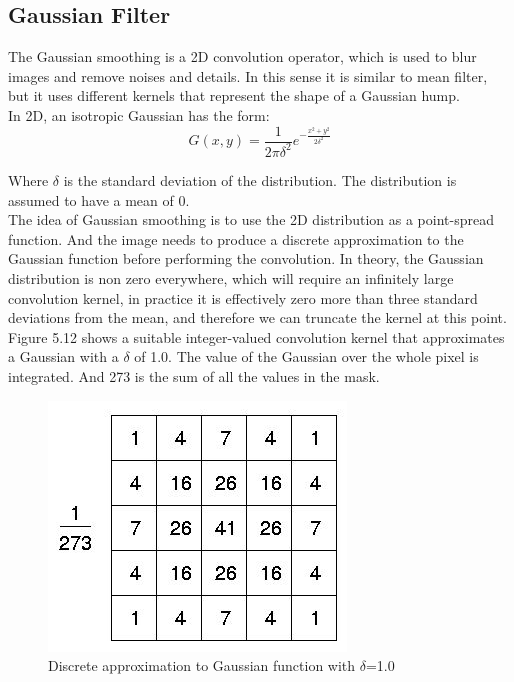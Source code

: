 \subsection{Gaussian Filter}
The Gaussian smoothing is a 2D convolution operator, which is used to blur images and remove noises and details. In this sense it is similar to mean filter, but it uses different kernels that represent the shape of a Gaussian hump. \\

In 2D, an isotropic Gaussian has the form:
\begin{displaymath}
G\left ( x,y \right ) = \frac{1}{2\pi \delta ^{2}}e^{-\frac{x^{2}+y^{2}}{2\delta ^{2}}}
\end{displaymath}

Where $\delta$ is the standard deviation of the distribution. The distribution is assumed to have a mean of 0.\\

The idea of Gaussian smoothing is to use the 2D distribution as a point-spread function. And the image needs to produce a discrete approximation to the Gaussian function before performing the convolution. In theory, the Gaussian distribution is non zero everywhere, which will require an infinitely large convolution kernel, in practice it is effectively zero more than three standard deviations from the mean, and therefore we can truncate the kernel at this point. Figure 5.12 shows a suitable integer-valued convolution kernel that approximates a Gaussian with a $\delta$ of 1.0. The value of the Gaussian over the whole pixel is integrated. And 273 is the sum of all the values in the mask.\\

\begin{figure}[!htb]
	\centering
	\includegraphics[scale=0.9]{img/gaussianmat}
	\caption{Discrete approximation to Gaussian function with $\delta$=1.0}
\end{figure}


